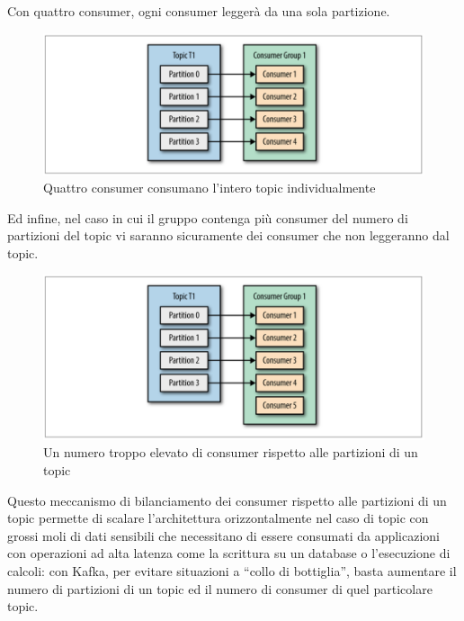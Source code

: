 \documentclass[]{article}
\begin{document}
\newpage

Con quattro consumer, ogni consumer leggerà da una sola partizione.

\begin{figure}
\centering
\includegraphics[width=1.00000\textwidth]{../images/four-consumers.png}
\caption{Quattro consumer consumano l'intero topic individualmente
\label{figure_3}}
\end{figure}

Ed infine, nel caso in cui il gruppo contenga più consumer del numero di
partizioni del topic vi saranno sicuramente dei consumer che non
leggeranno dal topic.

\begin{figure}
\centering
\includegraphics[width=1.00000\textwidth]{../images/five-consumers.png}
\caption{Un numero troppo elevato di consumer rispetto alle partizioni
di un topic \label{figure_3}}
\end{figure}

Questo meccanismo di bilanciamento dei consumer rispetto alle partizioni
di un topic permette di scalare l'architettura orizzontalmente nel caso
di topic con grossi moli di dati sensibili che necessitano di essere
consumati da applicazioni con operazioni ad alta latenza come la
scrittura su un database o l'esecuzione di calcoli: con Kafka, per
evitare situazioni a ``collo di bottiglia'', basta aumentare il numero
di partizioni di un topic ed il numero di consumer di quel particolare
topic.
\end{document}
